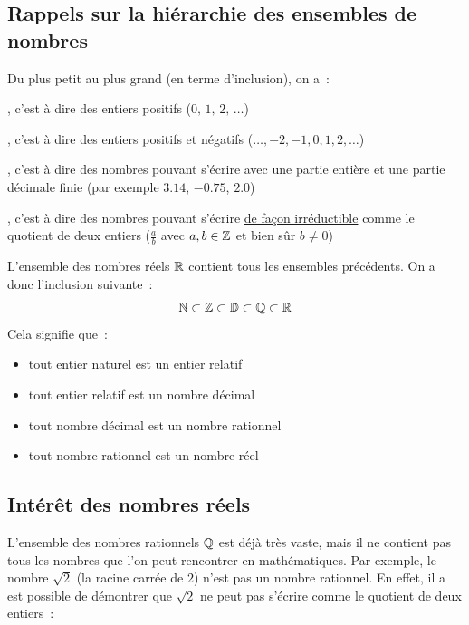 \subsection{Rappels sur la hiérarchie des ensembles de nombres}
Du plus petit au plus grand (en terme d'inclusion), on a~:
\begin{enumeratebf}
    \item {}, c'est à dire des entiers positifs ($0,\, 1,\, 2,\, \dots$)
    \item {}, c'est à dire des entiers positifs et négatifs ($\dots, -2, -1, 0, 1, 2, \dots$)
    \item {}, c'est à dire des nombres pouvant s'écrire avec une partie entière et une partie décimale finie (par exemple $3.14$, $-0.75$, $2.0$)
    \item {}, c'est à dire des nombres pouvant s'écrire \underline{de façon irréductible} comme le quotient de deux entiers ($\frac{a}{b}$ avec $a, b \in \mathbb{Z}$ et bien sûr $b \neq 0$)
\end{enumeratebf}
\vspace{1em}
L'ensemble des nombres réels $\mathbb{R}$ contient tous les ensembles précédents. On a donc l'inclusion suivante~:
$$ \mathbb{N} \subset \mathbb{Z} \subset \mathbb{D} \subset \mathbb{Q} \subset \mathbb{R} $$
Cela signifie que~:
\begin{itemize}
    \item tout entier naturel est un entier relatif
    \item tout entier relatif est un nombre décimal
    \item tout nombre décimal est un nombre rationnel
    \item tout nombre rationnel est un nombre réel
\end{itemize}
\newpage
\subsection{Intérêt des nombres réels}

L'ensemble des nombres rationnels $\mathbb{Q}$ est déjà très vaste, mais il ne contient pas tous les nombres que l'on peut rencontrer en mathématiques. Par exemple, le nombre $\sqrt{2}$ (la racine carrée de $2$) n'est pas un nombre rationnel. En effet, il a est possible de démontrer que $\sqrt{2}$ ne peut pas s'écrire comme le quotient de deux entiers~:


